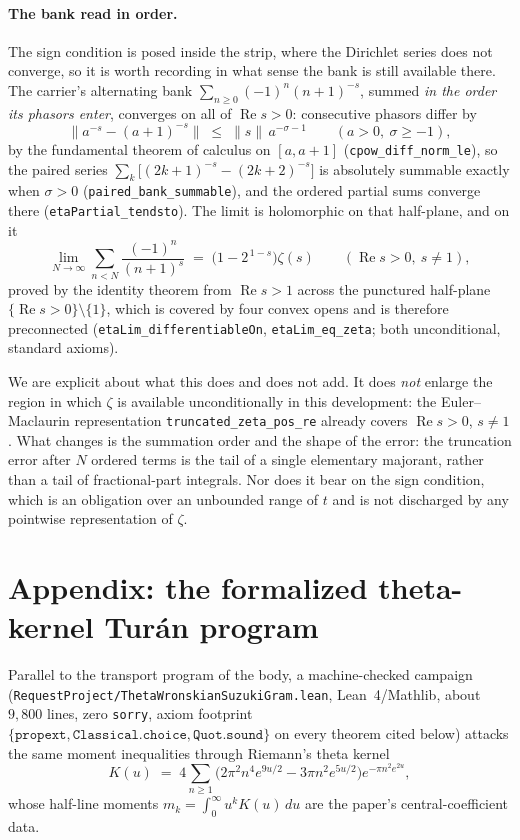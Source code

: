 \documentclass[11pt]{article}
\theoremstyle{plain}
\theoremstyle{definition}
\theoremstyle{remark}
\begin{document}
\paragraph{The bank read in order.}
The sign condition is posed inside the strip, where the Dirichlet series does
not converge, so it is worth recording in what sense the bank is still
available there. The carrier's alternating bank
$\sum_{n\ge0}(-1)^n(n+1)^{-s}$, summed \emph{in the order its phasors enter},
converges on all of $\operatorname{Re}s>0$: consecutive phasors differ by
\[
  \bigl\|a^{-s}-(a+1)^{-s}\bigr\|\;\le\;\|s\|\,a^{-\sigma-1}
  \qquad(a>0,\ \sigma\ge-1),
\]
by the fundamental theorem of calculus on $[a,a+1]$
(\texttt{cpow\_diff\_norm\_le}), so the paired series
$\sum_k\bigl[(2k+1)^{-s}-(2k+2)^{-s}\bigr]$ is absolutely summable exactly
when $\sigma>0$ (\texttt{paired\_bank\_summable}), and the ordered partial
sums converge there (\texttt{etaPartial\_tendsto}). The limit is holomorphic
on that half-plane, and on it
\[
  \lim_{N\to\infty}\sum_{n<N}\frac{(-1)^n}{(n+1)^s}
  \;=\;\bigl(1-2^{\,1-s}\bigr)\zeta(s)
  \qquad(\operatorname{Re}s>0,\ s\ne1),
\]
proved by the identity theorem from $\operatorname{Re}s>1$ across the
punctured half-plane $\{\operatorname{Re}s>0\}\setminus\{1\}$, which is
covered by four convex opens and is therefore preconnected
(\texttt{etaLim\_differentiableOn}, \texttt{etaLim\_eq\_zeta}; both
unconditional, standard axioms).

We are explicit about what this does and does not add. It does \emph{not}
enlarge the region in which $\zeta$ is available unconditionally in this
development: the Euler--Maclaurin representation
\texttt{truncated\_zeta\_pos\_re} already covers $\operatorname{Re}s>0$,
$s\ne1$. What changes is the summation order and the shape of the error: the
truncation error after $N$ ordered terms is the tail of a single elementary
majorant, rather than a tail of fractional-part integrals. Nor does it bear on
the sign condition, which is an obligation over an unbounded range of $t$ and
is not discharged by any pointwise representation of $\zeta$.

\section{Appendix: the formalized theta-kernel Tur\'an program}
\label{sec:leanappendix}

Parallel to the transport program of the body, a machine-checked campaign
(\texttt{RequestProject/ThetaWronskianSuzukiGram.lean}, Lean~4/Mathlib, about
$9{,}800$ lines, zero \texttt{sorry}, axiom footprint
$\{\texttt{propext},\texttt{Classical.choice},\texttt{Quot.sound}\}$ on every
theorem cited below) attacks the same moment inequalities through Riemann's
theta kernel
\[
  K(u) \;=\; 4\sum_{n\ge1}\bigl(2\pi^2n^4e^{9u/2}-3\pi n^2e^{5u/2}\bigr)
    e^{-\pi n^2e^{2u}},
\]
whose half-line moments $m_k=\int_0^\infty u^kK(u)\,du$ are the paper's
central-coefficient data.
\end{document}
